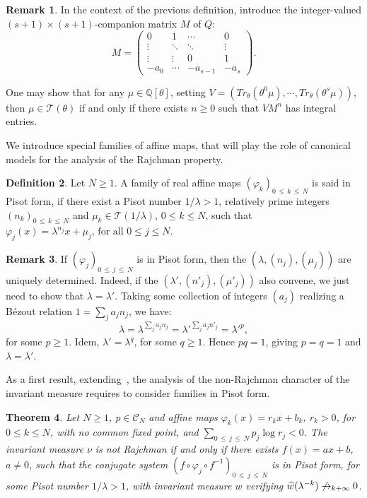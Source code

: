 \documentclass[10pt]{amsart}
\newtheorem{theo}{Theorem}[section]
\theoremstyle{definition}\newtheorem{defi}[theo]{Definition}\newtheorem{rema}[theo]{Remark}\newtheorem{exam}[theo]{Example}\newtheorem{exem}[theo]{Example}\newtheorem{nota}[theo]{Notation}
\newcommand{\Qbb}{\mathbb Q}
\newcommand{\Ccl}{\mathcal{C}}
\newcommand{\Tcl}{\mathcal{T}}
\let\oldhat\hat
\renewcommand*{\hat}[1]{\mathchoice{\widehat{#1}}{\widehat{#1}}{\oldhat{#1}}{\oldhat{#1}}}
\begin{document}
\begin{rema}
In the context of the previous definition, introduce the integer-valued $(s+1)\times(s+1)$-companion matrix $M$ of $Q$:
\[
M=\left(
\begin{matrix}
0&1&\cdots&0\\
\vdots&\ddots&\ddots&\vdots\\
\vdots&\vdots&0&1\\
-a_0&\cdots&-a_{s-1}&-a_s
\end{matrix}
\right).
\]


One may show that for any $\mu\in\Qbb[\theta]$, setting $V=(Tr_{\theta}(\theta^0\mu),\cdots,Tr_{\theta}(\theta^s\mu))$, then $\mu\in {\Tcl}(\theta)$ if and only if there exists $n\geq0$ such that $VM^n$ has integral entries.
\end{rema}

We introduce special families of affine maps, that will play the role of canonical models for the analysis of the Rajchman property.

\begin{defi}
Let $N\geq1$. A family of real affine maps $(\varphi_k)_{0\,\leq\,k\,\leq\,N}$ is said in Pisot form, if there exist a Pisot number $1/\lambda>1$, relatively prime integers $(n_k)_{0\,\leq\,k\,\leq\,N}$ and $\mu_k\in {\Tcl}(1/\lambda)$, $0\leq k\leq N$, such that $\varphi_j(x)=\lambda^{n_j}x+\mu_j\text{, for all }0\leq j\leq N$.
\end{defi}


\begin{rema}
If $(\varphi_j)_{0\,\leq\,j\,\leq\,N}$ is in Pisot form, then the $(\lambda,(n_j),(\mu_j))$ are uniquely determined. Indeed, if the $(\lambda',(n'_j),(\mu'_j))$ also convene, we just need to show that $\lambda=\lambda'$. Taking some collection of integers $(a_j)$ realizing a Bézout relation $1=\sum_j a_jn_j$, we have:
\[
\lambda=\lambda^{\sum_ja_jn_j}=\lambda'^{\sum_ja_jn'_j}=\lambda'^p,
\]
for some $p\geq1$. Idem, $\lambda'=\lambda^q$, for some $q\geq1$. Hence $pq=1$, giving $p=q=1$ and $\lambda=\lambda'$.
\end{rema}

As a first result, extending~\cite{salem}, the analysis of the non-Rajchman character of the invariant measure requires to consider families in Pisot form.


\begin{theo}\label{part1}
Let $N\geq 1$, $p\in{\Ccl}_N$ and affine maps $\varphi_k(x)=r_kx+b_k$, $r_k>0$, for $0\leq k\leq N$, with no common fixed point, and $\sum_{0\,\leq\,j\,\leq\,N}p_j\log r_j<0$. The invariant measure $\nu$ is not Rajchman if and only if there exists $f(x)=ax+b$, $a\not=0$, such that the conjugate system $(f\circ \varphi_j\circ f^{-1})_{0\,\leq\,j\,\leq\,N}$ is in Pisot form, for some Pisot number $1/\lambda>1$, with invariant measure $w$ verifying $\hat{w}(\lambda^{-k})\not\rightarrow_{k+\infty}0$.
\end{theo}
\end{document}
